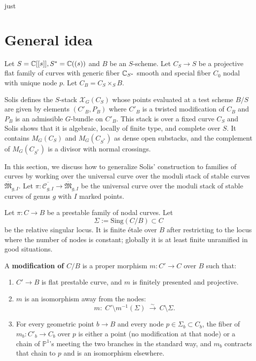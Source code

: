 just \documentclass[12pt]{article}
\begin{document}
\section{General idea}

Let $S = \mathbb{C}[[s]], S^* = \mathbb{C}((s))$ and $B$ be an $S$-scheme.  Let $C_S \to S$ be a projective flat family of curves with generic fiber $\mathbb{C}_{S^*}$ smooth and special fiber $C_0$ nodal with unique node $p$. Let $C_B = C_S \times_S B$.

Solis \cite{solis} defines the $S$-stack $\mathcal{X}_G(C_S)$ whose points evaluated at a test scheme $B/S$ are given by elements $(C'_B,P_B)$ where $C'_B$ is a twisted modification of $C_B$ and $P_B$ is an admissible $G$-bundle on $C'_B$. This stack is over a fixed curve $C_S$ and Solis shows that it is algebraic, locally of finite type, and complete over $S$. It contains $M_G(C_S)$ and $M_G(C_{S^*})$ as dense open substacks, and the complement of $M_G(C_{S^*})$ is a divisor with normal crossings.

In this section, we discuss how to generalize Solis' construction to families of curves by working over the universal curve over the moduli stack of stable curves $\overline{\mathfrak{M}}_{g,I}$. Let $\pi:\overline{\mathcal{C}_{g,I}} \to \overline{\mathfrak{M}}_{g,I}$ be the universal curve over the moduli stack of stable curves of genus $g$ with $I$ marked points.

Let $\pi:C\to B$ be a prestable family of nodal curves. Let
\[
\Sigma := \mathrm{Sing}(C/B)\subset C
\]
be the relative singular locus. It is finite étale over $B$ after restricting to the locus where the number of nodes is constant; globally it is at least finite unramified in good situations.
\begin{definition}
    

A \textbf{modification of $C/B$} is a proper morphism $m:C'\to C$ over $B$ such that:
\begin{enumerate}
\item $C'\to B$ is flat prestable curve, and $m$ is finitely presented and projective.

\item $m$ is an isomorphism away from the nodes:
\[
m:\; C'\setminus m^{-1}(\Sigma)\ \xrightarrow{\sim}\ C\setminus \Sigma.
\]

\item For every geometric point $b\to B$ and every node $p\in \Sigma_b\subset C_b$, the fiber of $m_b:C'_b\to C_b$ over $p$ is either a point (no modification at that node) or a chain of $\mathbb P^1$'s meeting the two branches in the standard way, and $m_b$ contracts that chain to $p$ and is an isomorphism elsewhere.
\end{enumerate}
\end{definition}
\end{document}
